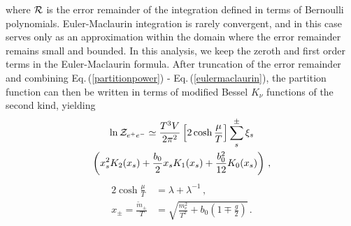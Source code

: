 \documentclass[reprint]{revtex4-2}
\newcommand{\req}[1]{Eq.\,(\ref{#1})}
\begin{document}
where ${\cal R}$ is the error remainder of the integration defined in terms of Bernoulli polynomials. Euler-Maclaurin integration is rarely convergent, and in this case serves only as an approximation within the domain where the error remainder remains small and bounded. In this analysis, we keep the zeroth and first order terms in the Euler-Maclaurin formula. After truncation of the error remainder and combining \req{partitionpower} - \req{eulermaclaurin}, the partition function can then be written in terms of modified Bessel $K_{\nu}$ functions of the second kind, yielding
\begin{multline}
    \label{boltzmann}
    \ln{\cal Z}_{e^{+}e^{-}}\simeq\frac{T^{3}V}{2\pi^{2}}\left[2\cosh{\frac{\mu}{T}}\right]\sum_{s}^{\pm}\xi_{s}\\
    \left(x_{s}^{2}K_{2}(x_{s})+\frac{b_{0}}{2}x_{s}K_{1}(x_{s})+\frac{b_{0}^{2}}{12}K_{0}(x_{s})\right)\,,
\end{multline}
\begin{align}
    \label{xfunc}
    2\cosh{\frac{\mu}{T}}&=\lambda+\lambda^{-1}\,,\\
    x_{\pm}=\frac{{\tilde m}_{\pm}}{T}&=\sqrt{\frac{m_{e}^{2}}{T^{2}}+b_{0}\left(1\mp\frac{g}{2}\right)}\,.
\end{align}
\end{document}
